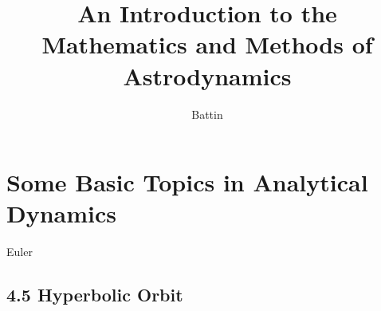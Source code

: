 \documentclass[12pt]{book}
\begin{document}
\title{An Introduction to the Mathematics and Methods of Astrodynamics}
\author{Battin}
\maketitle


\chapter{Some Basic Topics in Analytical Dynamics}
Euler

\section{4.5 Hyperbolic Orbit}
\end{document}

